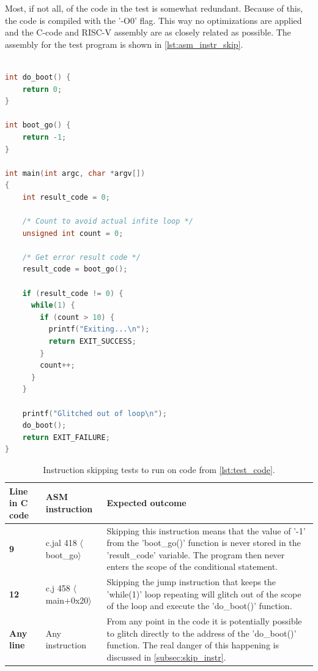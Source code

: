 Most, if not all, of the code in the test is somewhat redundant. Because of this, the code is compiled with the '-O0' flag. This way no optimizations are applied and the C-code and RISC-V assembly are as closely related as possible. The assembly for the test program is shown in \autoref{lst:asm_instr_skip}. 

\begin{lstlisting}[caption={Test code for simulating instruction skip.}, label=lst:test_code, language=C++]

int do_boot() {
    return 0;
}

int boot_go() {
    return -1;
}

int main(int argc, char *argv[])
{
    int result_code = 0;

    /* Count to avoid actual infite loop */
    unsigned int count = 0;

    /* Get error result code */
    result_code = boot_go();

    if (result_code != 0) {
      while(1) {
       	if (count > 10)	{
          printf("Exiting...\n");
       	  return EXIT_SUCCESS;
        }
        count++;
      }
    }

    printf("Glitched out of loop\n");
    do_boot();
    return EXIT_FAILURE;
}
\end{lstlisting}

\begin{table}[h]
\centering
\caption{Instruction skipping tests to run on code from \autoref{lst:test_code}.}
\label{tab:instr_skip_test}
\begin{tabular}{m{2.5cm}m{3.5cm}m{7.5cm}}
\toprule 
Line in C code & ASM instruction & Expected outcome \\
\midrule
\rowcolor{black!20} \textbf{9} & c.jal 418 $\langle$boot\_go$\rangle$ & Skipping this instruction means that the value of '-1' from the 'boot\_go()' function is never stored in the 'result\_code' variable. The program then never enters the scope of the conditional statement. \\
\textbf{12} & c.j 458 $\langle$main+0x20$\rangle$ & Skipping the jump instruction that keeps the 'while(1)' loop repeating will glitch out of the scope of the loop and execute the 'do\_boot()' function.  \\
\rowcolor{black!20} \textbf{Any line} & Any instruction & From any point in the code it is potentially possible to glitch directly to the address of the 'do\_boot()' function. The real danger of this happening is discussed in \autoref{subsec:skip_instr}. \\
\bottomrule
\end{tabular}
\end{table}

